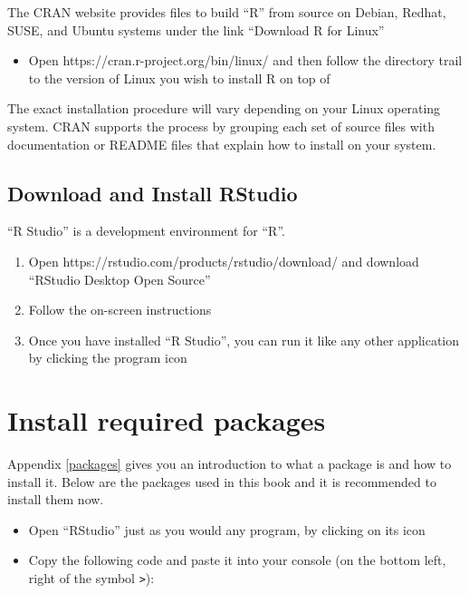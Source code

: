 \documentclass[
]{book}
\providecommand{\tightlist}{%
  \setlength{\itemsep}{0pt}\setlength{\parskip}{0pt}}
\begin{document}
The CRAN website provides files to build ``R'' from source on Debian, Redhat, SUSE, and Ubuntu systems under the link ``Download R for Linux''

\begin{itemize}
\tightlist
\item
  Open https://cran.r-project.org/bin/linux/ and then follow the directory trail to the version of Linux you wish to install R on top of
\end{itemize}

The exact installation procedure will vary depending on your Linux operating system. CRAN supports the process by grouping each set of source files with documentation or README files that explain how to install on your system.

\hypertarget{download-and-install-rstudio}{%
\subsection{Download and Install RStudio}\label{download-and-install-rstudio}}

``R Studio'' is a development environment for ``R''.

\begin{enumerate}
\def\labelenumi{\arabic{enumi}.}
\tightlist
\item
  Open https://rstudio.com/products/rstudio/download/ and download ``RStudio Desktop Open Source''
\item
  Follow the on-screen instructions
\item
  Once you have installed ``R Studio'', you can run it like any other application by clicking the program icon
\end{enumerate}

\hypertarget{install-required-packages}{%
\section{Install required packages}\label{install-required-packages}}

Appendix \ref{packages} gives you an introduction to what a package is and how to install it. Below are the packages used in this book and it is recommended to install them now.

\begin{itemize}
\item
  Open ``RStudio'' just as you would any program, by clicking on its icon
\item
  Copy the following code and paste it into your console (on the bottom left, right of the symbol \texttt{\textgreater{}}):
\end{itemize}
\end{document}
